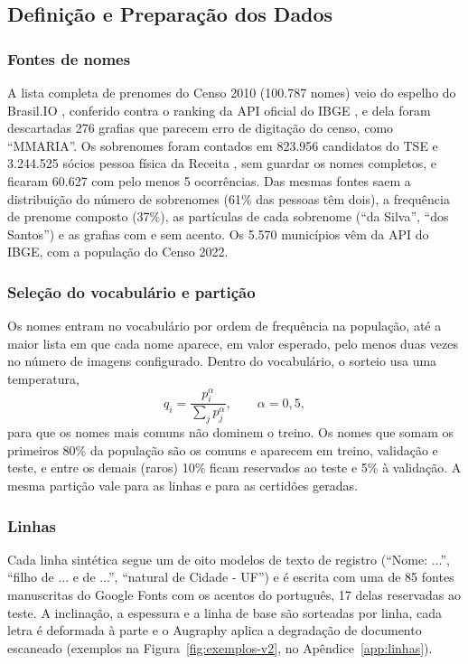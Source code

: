\subsection{Definição e Preparação dos Dados}
\label{subsec:dados}

\subsubsection{Fontes de nomes}
A lista completa de prenomes do Censo 2010 (100.787 nomes) veio do espelho do Brasil.IO \cite{brasilio_nomes}, conferido contra o ranking da API oficial do IBGE \cite{ibge_nomes}, e dela foram descartadas 276 grafias que parecem erro de digitação do censo, como ``MMARIA''. Os sobrenomes foram contados em 823.956 candidatos do TSE \cite{tse_eleitorado} e 3.244.525 sócios pessoa física da Receita \cite{rfb_socios}, sem guardar os nomes completos, e ficaram 60.627 com pelo menos 5 ocorrências. Das mesmas fontes saem a distribuição do número de sobrenomes (61\% das pessoas têm dois), a frequência de prenome composto (37\%), as partículas de cada sobrenome (``da Silva'', ``dos Santos'') e as grafias com e sem acento. Os 5.570 municípios vêm da API do IBGE, com a população do Censo 2022.

\subsubsection{Seleção do vocabulário e partição}
Os nomes entram no vocabulário por ordem de frequência na população, até a maior lista em que cada nome aparece, em valor esperado, pelo menos duas vezes no número de imagens configurado. Dentro do vocabulário, o sorteio usa uma temperatura,
\[
q_i = \frac{p_i^{\alpha}}{\sum_j p_j^{\alpha}}, \qquad \alpha = 0{,}5,
\]
para que os nomes mais comuns não dominem o treino. Os nomes que somam os primeiros 80\% da população são os comuns e aparecem em treino, validação e teste, e entre os demais (raros) 10\% ficam reservados ao teste e 5\% à validação. A mesma partição vale para as linhas e para as certidões geradas.

\subsubsection{Linhas}
\label{subsec:dados-linhas}
Cada linha sintética segue um de oito modelos de texto de registro (``Nome: ...'', ``filho de ... e de ...'', ``natural de Cidade - UF'') e é escrita com uma de 85 fontes manuscritas do Google Fonts com os acentos do português, 17 delas reservadas ao teste. A inclinação, a espessura e a linha de base são sorteadas por linha, cada letra é deformada à parte e o Augraphy aplica a degradação de documento escaneado (exemplos na Figura~\ref{fig:exemplos-v2}, no Apêndice~\ref{app:linhas}).

